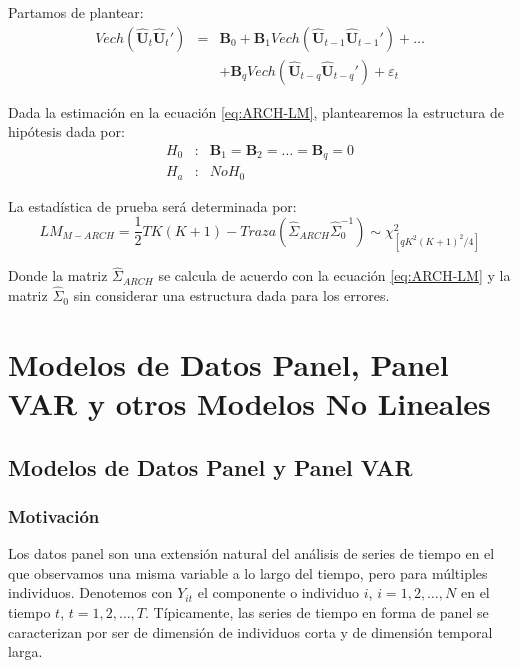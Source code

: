 \documentclass[
]{book}
\begin{document}
Partamos de plantear:
\begin{eqnarray}
    Vech(\hat{\mathbf{U}}_t \hat{\mathbf{U}}_t') & = & \mathbf{B}_0 + \mathbf{B}_1 Vech(\hat{\mathbf{U}}_{t-1} \hat{\mathbf{U}}_{t-1}') + \ldots \\ \nonumber
    & & + \mathbf{B}_q Vech(\hat{\mathbf{U}}_{t-q} \hat{\mathbf{U}}_{t-q}') + \varepsilon_t
    \label{eq:ARCH-LM}
\end{eqnarray}

Dada la estimación en la ecuación \eqref{eq:ARCH-LM}, plantearemos la estructura de hipótesis dada por:
\begin{eqnarray*}
    H_0 & : & \mathbf{B}_1 = \mathbf{B}_2 = \ldots = \mathbf{B}_q = 0 \\
    H_a & : & No H_0    
\end{eqnarray*}

La estadística de prueba será determinada por:
\begin{equation}
    LM_{M-ARCH} = \frac{1}{2} T K (K + 1) - Traza \left( \hat{\Sigma}_{ARCH} \hat{\Sigma}^{-1}_{0} \right) \sim \chi^2_{[q K^2 (K + 1)^2 / 4]}
\end{equation}

Donde la matriz \(\hat{\Sigma}_{ARCH}\) se calcula de acuerdo con la ecuación \eqref{eq:ARCH-LM} y la matriz \(\hat{\Sigma}_{0}\) sin considerar una estructura dada para los errores.

\hypertarget{modelos-de-datos-panel-panel-var-y-otros-modelos-no-lineales}{%
\chapter{Modelos de Datos Panel, Panel VAR y otros Modelos No Lineales}\label{modelos-de-datos-panel-panel-var-y-otros-modelos-no-lineales}}

\hypertarget{modelos-de-datos-panel-y-panel-var}{%
\section{Modelos de Datos Panel y Panel VAR}\label{modelos-de-datos-panel-y-panel-var}}

\hypertarget{motivaciuxf3n-2}{%
\subsection{Motivación}\label{motivaciuxf3n-2}}

Los datos panel son una extensión natural del análisis de series de tiempo en el que observamos una misma variable a lo largo del tiempo, pero para múltiples individuos. Denotemos con \(Y_{it}\) el componente o individuo \(i\), \(i = 1, 2, \ldots, N\) en el tiempo \(t\), \(t = 1, 2, \ldots, T\). Típicamente, las series de tiempo en forma de panel se caracterizan por ser de dimensión de individuos corta y de dimensión temporal larga.
\end{document}
